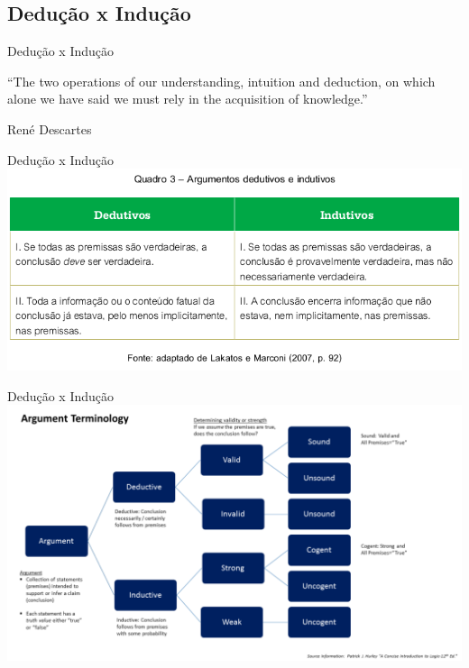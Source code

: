 \documentclass{beamer}
\begin{document}
\subsection{Dedução x Indução}

\begin{frame}{Dedução x Indução}
  \begin{block}{}
    ``The two operations of our understanding, intuition and deduction,
    on which alone we have said we must rely in the acquisition of
    knowledge.''

    \footnotesize
    \hfill René Descartes
  \end{block}
\end{frame}

\begin{frame}{Dedução x Indução}
\includegraphics[width=1.05\textwidth]{Metodos/deducao_vs_inducao}
\end{frame}

\begin{frame}{Dedução x Indução}
\includegraphics[width=1.2\textwidth]{Metodos/Argument_terminology_used_in_logic}
\end{frame}
\end{document}

